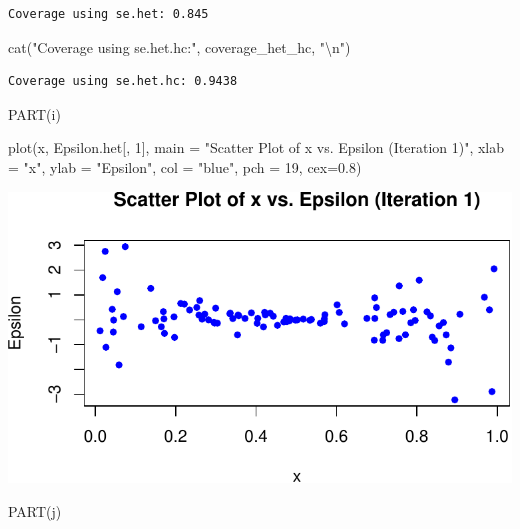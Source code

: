 \documentclass[
  11pt,
]{article}
\newenvironment{Shaded}{\begin{snugshade}}{\end{snugshade}}
\newcommand{\AttributeTok}[1]{\textcolor[rgb]{0.40,0.45,0.13}{#1}}
\newcommand{\DecValTok}[1]{\textcolor[rgb]{0.68,0.00,0.00}{#1}}
\newcommand{\FloatTok}[1]{\textcolor[rgb]{0.68,0.00,0.00}{#1}}
\newcommand{\FunctionTok}[1]{\textcolor[rgb]{0.28,0.35,0.67}{#1}}
\newcommand{\NormalTok}[1]{\textcolor[rgb]{0.00,0.23,0.31}{#1}}
\newcommand{\SpecialCharTok}[1]{\textcolor[rgb]{0.37,0.37,0.37}{#1}}
\newcommand{\StringTok}[1]{\textcolor[rgb]{0.13,0.47,0.30}{#1}}
\begin{document}
\begin{verbatim}
Coverage using se.het: 0.845 
\end{verbatim}

\begin{Shaded}
\begin{Highlighting}[]
\FunctionTok{cat}\NormalTok{(}\StringTok{"Coverage using se.het.hc:"}\NormalTok{, coverage\_het\_hc, }\StringTok{"}\SpecialCharTok{\textbackslash{}n}\StringTok{"}\NormalTok{)}
\end{Highlighting}
\end{Shaded}

\begin{verbatim}
Coverage using se.het.hc: 0.9438 
\end{verbatim}

PART(i)

\begin{Shaded}
\begin{Highlighting}[]
\FunctionTok{plot}\NormalTok{(x, Epsilon.het[, }\DecValTok{1}\NormalTok{], }\AttributeTok{main =} \StringTok{"Scatter Plot of x vs. Epsilon (Iteration 1)"}\NormalTok{, }
     \AttributeTok{xlab =} \StringTok{"x"}\NormalTok{, }\AttributeTok{ylab =} \StringTok{"Epsilon"}\NormalTok{, }\AttributeTok{col =} \StringTok{"blue"}\NormalTok{, }\AttributeTok{pch =} \DecValTok{19}\NormalTok{, }\AttributeTok{cex=}\FloatTok{0.8}\NormalTok{)}
\end{Highlighting}
\end{Shaded}

\includegraphics{HW-4-CODE-and-ANSWERS_files/figure-pdf/unnamed-chunk-18-1.pdf}

PART(j)
\end{document}

